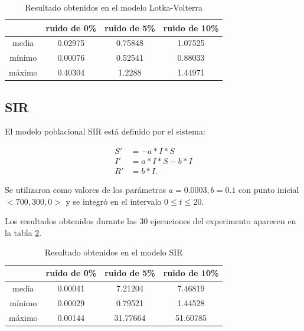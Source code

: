 \begin{table}[!h]
    \centering
    \caption{Resultado obtenidos en el modelo Lotka-Volterra}
    \begin{tabular}{|c|c|c|c|}
        \hline
               & \textbf{ruido de 0\%} & \textbf{ruido de 5\%} & \textbf{ruido de 10\%} \\
        \hline
        media  & 0.02975               & 0.75848               & 1.07525                \\
        \hline
        mínimo & 0.00076               & 0.52541               & 0.88033                \\
        \hline
        máximo & 0.40304               & 1.2288                & 1.44971                \\
        \hline
    \end{tabular}
    \label{table:experiment_lotka_volterra}
\end{table}


\subsection{SIR}

El modelo poblacional SIR está definido por el sistema:

\begin{align*}
    S' & = - a*I*S     \\
    I' & = a*I*S - b*I \\
    R' & = b*I.
\end{align*}

Se utilizaron como valores de los parámetros $a = 0.0003, b = 0.1$ con punto inicial $<700, 300, 0>$ y se integró en el intervalo $0 \leq t \leq 20$.

Los resultados obtenidos durante las 30 ejecuciones del experimento aparecen en la tabla \ref{table:experiment_SIR}.

\begin{table}[!h]
    \centering
    \caption{Resultado obtenidos en el modelo SIR}
    \begin{tabular}{|c|c|c|c|}
        \hline
               & \textbf{ruido de 0\%} & \textbf{ruido de 5\%} & \textbf{ruido de 10\%} \\
        \hline
        media  & 0.00041               & 7.21204               & 7.46819                \\
        \hline
        mínimo & 0.00029               & 0.79521               & 1.44528                \\
        \hline
        máximo & 0.00144               & 31.77664              & 51.60785               \\
        \hline
    \end{tabular}
    \label{table:experiment_SIR}
\end{table}




